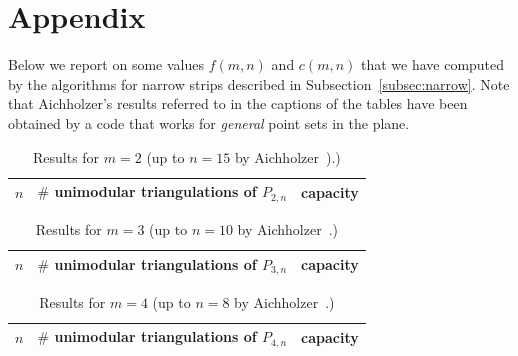 
\section*{Appendix}
\label{sec:appendix}

Below we report on some values $f(m,n)$ and $c(m,n)$ that we have
computed by the algorithms for narrow strips described in
Subsection~\ref{subsec:narrow}. Note that Aichholzer's results referred to in
the captions of the tables have been obtained by a code that works for
\emph{general} point sets in the plane.

\medskip

\begin{table}[h]
  \centering
  {\footnotesize
    \begin{tabular}{rp{}p{}@{}}
      \hline
      \multicolumn{1}{c}{$n$\hspace{10mm}} &
      \multicolumn{1}{c}{$\#$ unimodular triangulations  of $P_{2,n}$} &
      \multicolumn{1}{c}{capacity} \\
      \hline
      
      \hline
    \end{tabular}
  }
  \caption{Results for $m=2$ (up to $n=15$ 
     by Aichholzer~\cite{Aichholzer-WWW}).)}
  \label{tab:m2}
\end{table}


\begin{table}[h]
  \centering
  {\footnotesize 
    \begin{tabular}{rp{}p{}@{}}
      \hline
      \multicolumn{1}{c}{$n$\hspace{10mm}} &
      \multicolumn{1}{c}{$\#$ unimodular triangulations of $P_{3,n}$} &
      \multicolumn{1}{c}{capacity} \\
      \hline
      
      \hline
    \end{tabular}
  }
  \caption{Results for $m=3$ (up to $n=10$ 
     by Aichholzer~\cite{Aichholzer-WWW}.)}
  \label{tab:m3}
\end{table}


\begin{table}[ht]
  \centering
  {\footnotesize
    \begin{sideways}
      \begin{tabular}{rrr}
        \hline
        \multicolumn{1}{c}{$n$\hspace{10mm}} &
        \multicolumn{1}{c}{$\#$ unimodular triangulations of $P_{4,n}$} &
        \multicolumn{1}{c}{capacity} \\
        \hline
        
        \hline
      \end{tabular}
    \end{sideways}
  }
  \caption{Results for $m=4$ (up to $n=8$ 
      by Aichholzer~\cite{Aichholzer-WWW}.)}
  \label{tab:m4}
\end{table}




